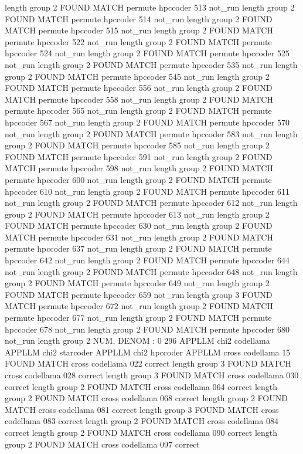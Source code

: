 length group  2
FOUND MATCH permute hpccoder 513 not_run
length group  2
FOUND MATCH permute hpccoder 514 not_run
length group  2
FOUND MATCH permute hpccoder 515 not_run
length group  2
FOUND MATCH permute hpccoder 522 not_run
length group  2
FOUND MATCH permute hpccoder 524 not_run
length group  2
FOUND MATCH permute hpccoder 525 not_run
length group  2
FOUND MATCH permute hpccoder 535 not_run
length group  2
FOUND MATCH permute hpccoder 545 not_run
length group  2
FOUND MATCH permute hpccoder 556 not_run
length group  2
FOUND MATCH permute hpccoder 558 not_run
length group  2
FOUND MATCH permute hpccoder 565 not_run
length group  2
FOUND MATCH permute hpccoder 567 not_run
length group  2
FOUND MATCH permute hpccoder 570 not_run
length group  2
FOUND MATCH permute hpccoder 583 not_run
length group  2
FOUND MATCH permute hpccoder 585 not_run
length group  2
FOUND MATCH permute hpccoder 591 not_run
length group  2
FOUND MATCH permute hpccoder 598 not_run
length group  2
FOUND MATCH permute hpccoder 600 not_run
length group  2
FOUND MATCH permute hpccoder 610 not_run
length group  2
FOUND MATCH permute hpccoder 611 not_run
length group  2
FOUND MATCH permute hpccoder 612 not_run
length group  2
FOUND MATCH permute hpccoder 613 not_run
length group  2
FOUND MATCH permute hpccoder 630 not_run
length group  2
FOUND MATCH permute hpccoder 631 not_run
length group  2
FOUND MATCH permute hpccoder 637 not_run
length group  2
FOUND MATCH permute hpccoder 642 not_run
length group  2
FOUND MATCH permute hpccoder 644 not_run
length group  2
FOUND MATCH permute hpccoder 648 not_run
length group  2
FOUND MATCH permute hpccoder 649 not_run
length group  2
FOUND MATCH permute hpccoder 659 not_run
length group  3
FOUND MATCH permute hpccoder 672 not_run
length group  2
FOUND MATCH permute hpccoder 677 not_run
length group  2
FOUND MATCH permute hpccoder 678 not_run
length group  2
FOUND MATCH permute hpccoder 680 not_run
length group  2
NUM, DENOM : 0 296
APPLLM chi2 codellama
APPLLM chi2 starcoder
APPLLM chi2 hpccoder
APPLLM cross codellama
15
FOUND MATCH cross codellama 022 correct
length group  3
FOUND MATCH cross codellama 028 correct
length group  3
FOUND MATCH cross codellama 030 correct
length group  2
FOUND MATCH cross codellama 064 correct
length group  2
FOUND MATCH cross codellama 068 correct
length group  2
FOUND MATCH cross codellama 081 correct
length group  3
FOUND MATCH cross codellama 083 correct
length group  2
FOUND MATCH cross codellama 084 correct
length group  2
FOUND MATCH cross codellama 090 correct
length group  2
FOUND MATCH cross codellama 097 correct

